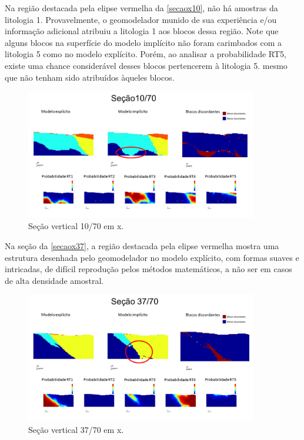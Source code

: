 Na região destacada pela elipse vermelha da \autoref{secaox10}, não há amostras da litologia 1. Provavelmente, o geomodelador munido de sua experiência e/ou informação adicional atribuiu a litologia 1 aos blocos dessa região. Note que alguns blocos na superfície do modelo implícito não foram carimbados com a litologia 5 como no modelo explícito. Porém, ao analisar a probabilidade RT5, existe uma chance considerável desses blocos pertencerem à litologia 5. mesmo que não tenham sido atribuídos àqueles blocos.   

\begin{figure}[H]
	\caption{\label{secaox10}Seção vertical 10/70 em x.}
	\begin{center}
		\includegraphics[width=0.9\textwidth]{estudo_de_caso/secaox10}
	\end{center}
\end{figure}

Na seção da \autoref{secaox37}, a região destacada pela elipse vermelha mostra uma estrutura desenhada pelo geomodelador no modelo explícito, com formas suaves e intricadas, de difícil reprodução pelos métodos matemáticos, a não ser em casos de alta densidade amostral. 

\begin{figure}[H]
	\caption{\label{secaox37}Seção vertical 37/70 em x.}
	\begin{center}
		\includegraphics[width=0.9\textwidth]{estudo_de_caso/secaox37}
	\end{center}
\end{figure}

